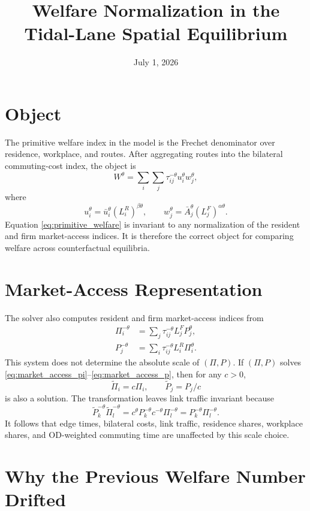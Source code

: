 \documentclass[11pt]{article}
\title{Welfare Normalization in the Tidal-Lane Spatial Equilibrium}
\author{}
\date{July 1, 2026}
\begin{document}
\maketitle

\section{Object}

The primitive welfare index in the model is the Frechet denominator over residence, workplace, and routes. After aggregating routes into the bilateral commuting-cost index, the object is
\begin{equation}
\label{eq:primitive_welfare}
    W^\theta
    =
    \sum_i \sum_j
    \tau_{ij}^{-\theta} u_i^\theta w_j^\theta ,
\end{equation}
where
\[
    u_i^\theta = \bar u_i^\theta (L_i^R)^{\beta\theta},
    \qquad
    w_j^\theta = \bar A_j^\theta (L_j^F)^{\alpha\theta}.
\]
Equation \eqref{eq:primitive_welfare} is invariant to any normalization of the resident and firm market-access indices. It is therefore the correct object for comparing welfare across counterfactual equilibria.

\section{Market-Access Representation}

The solver also computes resident and firm market-access indices from
\begin{align}
\label{eq:market_access_pi}
    \Pi_i^{-\theta}
    &=
    \sum_j \tau_{ij}^{-\theta} L_j^F P_j^\theta, \\
\label{eq:market_access_p}
    P_j^{-\theta}
    &=
    \sum_i \tau_{ij}^{-\theta} L_i^R \Pi_i^\theta .
\end{align}
This system does not determine the absolute scale of $(\Pi,P)$. If $(\Pi,P)$ solves \eqref{eq:market_access_pi}--\eqref{eq:market_access_p}, then for any $c>0$,
\[
    \tilde \Pi_i = c\Pi_i,
    \qquad
    \tilde P_j = P_j/c
\]
is also a solution. The transformation leaves link traffic invariant because
\[
    \tilde P_k^{-\theta}\tilde \Pi_l^{-\theta}
    =
    c^\theta P_k^{-\theta}
    c^{-\theta} \Pi_l^{-\theta}
    =
    P_k^{-\theta}\Pi_l^{-\theta}.
\]
It follows that edge times, bilateral costs, link traffic, residence shares, workplace shares, and OD-weighted commuting time are unaffected by this scale choice.

\section{Why the Previous Welfare Number Drifted}
\end{document}
